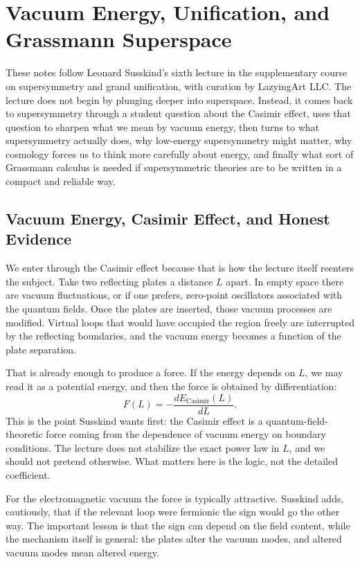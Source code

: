 \chapter{Vacuum Energy, Unification, and Grassmann Superspace}

These notes follow Leonard Susskind's sixth lecture in the supplementary course on supersymmetry and grand unification, with curation by LazyingArt LLC. The lecture does not begin by plunging deeper into superspace. Instead, it comes back to supersymmetry through a student question about the Casimir effect, uses that question to sharpen what we mean by vacuum energy, then turns to what supersymmetry actually does, why low-energy supersymmetry might matter, why cosmology forces us to think more carefully about energy, and finally what sort of Grassmann calculus is needed if supersymmetric theories are to be written in a compact and reliable way.

\section{Vacuum Energy, Casimir Effect, and Honest Evidence}

We enter through the Casimir effect because that is how the lecture itself reenters the subject. Take two reflecting plates a distance \(L\) apart. In empty space there are vacuum fluctuations, or if one prefers, zero-point oscillators associated with the quantum fields. Once the plates are inserted, those vacuum processes are modified. Virtual loops that would have occupied the region freely are interrupted by the reflecting boundaries, and the vacuum energy becomes a function of the plate separation.

That is already enough to produce a force. If the energy depends on \(L\), we may read it as a potential energy, and then the force is obtained by differentiation:
\begin{equation}
F(L)=-\frac{dE_{\mathrm{Casimir}}(L)}{dL}.
\end{equation}
This is the point Susskind wants first: the Casimir effect is a quantum-field-theoretic force coming from the dependence of vacuum energy on boundary conditions. The lecture does not stabilize the exact power law in \(L\), and we should not pretend otherwise. What matters here is the logic, not the detailed coefficient.

For the electromagnetic vacuum the force is typically attractive. Susskind adds, cautiously, that if the relevant loop were fermionic the sign would go the other way. The important lesson is that the sign can depend on the field content, while the mechanism itself is general: the plates alter the vacuum modes, and altered vacuum modes mean altered energy.

